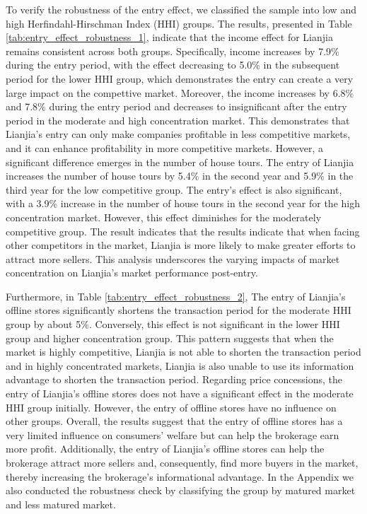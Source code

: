 \documentclass[11pt]{article}
\begin{document}
To verify the robustness of the entry effect, we classified the sample into low and high Herfindahl-Hirschman Index (HHI) groups. The results, presented in Table \ref{tab:entry_effect_robustness_1}, indicate that the income effect for Lianjia remains consistent across both groups. Specifically, income increases by 7.9\% during the entry period, with the effect decreasing to 5.0\% in the subsequent period for the lower HHI group, which demonstrates the entry can create a very large impact on the compettive market. Moreover, the income increases by 6.8\% and 7.8\% during the entry period and decreases to insignificant after the entry period in the moderate and high concentration market. This demonstrates that Lianjia's entry can only make companies profitable in less competitive markets, and it can enhance profitability in more competitive markets. However, a significant difference emerges in the number of house tours. The entry of Lianjia increases the number of house tours by 5.4\% in the second year and 5.9\% in the third year for the low competitive group. The entry's effect is also significant, with a 3.9\% increase in the number of house tours in the second year for the high concentration market. However, this effect diminishes for the moderately competitive group. The result indicates that the results indicate that when facing other competitors in the market, Lianjia is more likely to make greater efforts to attract more sellers. This analysis underscores the varying impacts of market concentration on Lianjia's market performance post-entry.

Furthermore, in Table \ref{tab:entry_effect_robustness_2}, The entry of Lianjia's offline stores significantly shortens the transaction period for the moderate HHI group by about 5\%. Conversely, this effect is not significant in the lower HHI group and higher concentration group. This pattern suggests that when the market is highly competitive, Lianjia is not able to shorten the transaction period and in highly concentrated markets, Lianjia is also unable to use its information advantage to shorten the transaction period. Regarding price concessions, the entry of Lianjia's offline stores does not have a significant effect in the moderate HHI group initially. However, the entry of offline stores have no influence on other groups. Overall, the results suggest that the entry of offline stores has a very limited influence on consumers' welfare but can help the brokerage earn more profit. Additionally, the entry of Lianjia's offline stores can help the brokerage attract more sellers and, consequently, find more buyers in the market, thereby increasing the brokerage's informational advantage. In the Appendix we also conducted the robustness check by classifying the group by matured market and less matured market.
\end{document}
